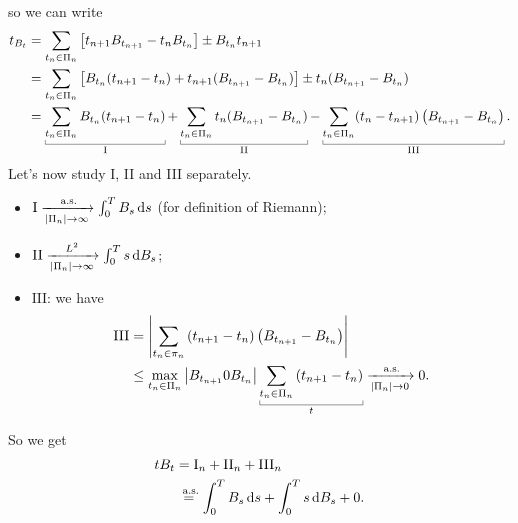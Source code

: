 \documentclass[12pt]{report}
\begin{document}
so we can write
\begin{align*}
	t_{B_{t}}&=\sum_{t_{n}\in\Pi_{n}}\left[t_{n+1}B_{t_{n+1}}-t_{n}B_{t_{n}}\right]\pm B_{t_{n}}t_{n+1}\\
	&=\sum_{t_{n}\in\Pi_{n}}\left[B_{t_{n}}(t_{n+1}-t_{n})+t_{n+1}(B_{t_{n+1}}-B_{t_{n}})\right]\pm t_{n}(B_{t_{n+1}}-B_{t_{n}})\\
	&=\ubracketthin{\sum_{t_{n}\in\Pi_{n}}B_{t_{n}}(t_{n+1}-t_{n})}_{\mathrm{I}}+\ubracketthin{\sum_{t_{n}\in\Pi_{n}}t_{n}(B_{t_{n+1}}-B_{t_{n}})}_{\mathrm{II}}-\ubracketthin{\sum_{t_{n}\in\Pi_{n}}(t_{n}-t_{n+1})\left(B_{t_{n+1}}-B_{t_{n}}\right)}_{\mathrm{III}}.
\end{align*}
Let's now study I, II and III separately.
\begin{itemize}
	\item $\mathrm{I}\xrightarrow[|\Pi_{n}|\to\infty]{\text{ a.s.}{}}\int_{0}^{T}B_{s}\mathop{}\!\mathrm{d} s$ (for definition of Riemann);
	\item $\mathrm{II}\xrightarrow[|\Pi_{n}|\to\infty]{L^{2}}\int_{0}^{T}s\mathop{}\!\mathrm{d} B_{s}$;
	\item $\mathrm{III}$: we have 
	\begin{align*}
		\mathrm{III}&=\left|\sum_{t_{n}\in \pi_{n}}\left(t_{n+1}-t_{n}\right)\left(B_{t_{n+1}}-B_{t_{n}}\right)\right|\\
		&\leq\max_{t_{n}\in\Pi_{n}}\left|B_{t_{n+1}}0B_{t_{n}}\right|\ubracketthin{\sum_{t_{n}\in\Pi_{n}}\left(t_{n+1}-t_{n}\right)}_{t}\xrightarrow[|\Pi_{n}|\to0]{\as{}}0.
	\end{align*}
\end{itemize}
So we get
\begin{align*}
	tB_{t}&=\mathrm{I}_{n}+\mathrm{II}_{n}+\mathrm{III}_{n}\\
	&\stackrel{\text{ a.s.}{}}{=}\int_{0}^{T}B_{s}\mathop{}\!\mathrm{d} s+\int_{0}^{T}s\mathop{}\!\mathrm{d} B_{s}+0.
\end{align*}
\end{document}
